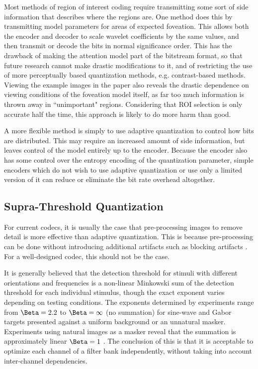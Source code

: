 \documentclass[11pt,letterpaper]{article}
\begin{document}
Most methods of region of interest coding require transmitting some sort of
 side information that describes where the regions are.
One method does this by transmitting model parameters for areas of expected
 foveation.%
This allows both the encoder and decoder to scale wavelet coefficients by the
 same values, and then transmit or decode the bits in normal significance
 order.
This has the drawback of making the attention model part of the bitstream
 format, so that future research cannot make drastic modifications to it, and
 of restricting the use of more perceptually based quantization methods, e.g.
 contrast-based methods.
Viewing the example images in the paper also reveals the drastic dependence on
 viewing conditions of the foveation model itself, as far too much information
 is thrown away in ``unimportant" regions.
Considering that ROI selection is only accurate half the time, this approach is
 likely to do more harm than good.

A more flexible method is simply to use adaptive quantization to control how
 bits are distributed.
This may require an increased amount of side information, but leaves control
 of the model entirely up to the encoder.
Because the encoder also has some control over the entropy encoding of the
 quantization parameter, simple encoders which do not wish to use adaptive
 quantization or use only a limited version of it can reduce or eliminate the
 bit rate overhead altogether.

\subsection{Supra-Threshold Quantization}

For current codecs, it is usually the case that pre-processing images to
 remove detail is more effective than adaptive quantization.
This is because pre-processing can be done without introducing additional
 artifacts such as blocking artifacts \cite{Osb99}.
For a well-designed codec, this should not be the case.

It is generally believed that the detection threshold for stimuli with
 different orientations and frequencies is a non-linear Minkowski sum of the
 detection threshold for each individual stimulus, though the exact exponent
 varies depending on testing conditions.
The exponents determined by experiments range from $\Beta=2.2$ to
 $\Beta=\infty$ (no summation) for sine-wave and Gabor targets presented
 against a uniform background or an unnatural masker.
Experiments using natural images as a masker reveal that the summation is
 approximately linear $\Beta=1$ \cite{CH02a}.
The conclusion of this is that it is acceptable to optimize each channel of a
 filter bank independently, without taking into account inter-channel
 dependencies.
\end{document}
